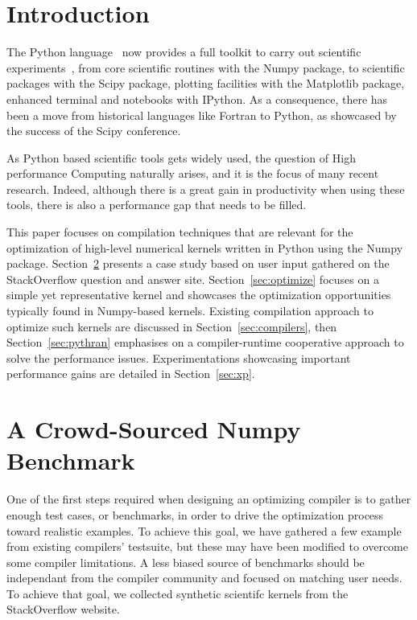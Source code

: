 \documentclass[10pt, preprint]{sigplanconf}
\begin{document}
\section{Introduction}

The Python language~\cite{rossum97} now provides a full toolkit to carry out
scientific experiments~\cite{scipy}, from core scientific routines with the
Numpy package, to scientific packages with the Scipy package, plotting
facilities with the Matplotlib package, enhanced terminal and notebooks with
IPython. As a consequence, there has been a move from historical languages like
Fortran to Python, as showcased by the success of the Scipy conference.

As Python based scientific tools gets widely used, the question of High
performance Computing naturally arises, and it is the focus of many recent
research. Indeed, although there is a great gain in productivity when using
these tools, there is also a performance gap that needs to be filled.

This paper focuses on compilation techniques that are relevant for the
optimization of high-level numerical kernels written in Python using the Numpy
package. Section~\ref{sec:stackoverflow} presents a case study based on user
input gathered on the StackOverflow question and answer site.
Section~\ref{sec:optimize} focuses on a simple yet representative kernel and
showcases the optimization opportunities typically found in Numpy-based
kernels. Existing compilation approach to optimize such kernels are discussed
in Section~\ref{sec:compilers}, then Section~\ref{sec:pythran} emphasises on a
compiler-runtime cooperative approach to solve the performance issues.
Experimentations showcasing important performance gains are detailed in
Section~\ref{sec:xp}.


\section{A Crowd-Sourced Numpy Benchmark}
\label{sec:stackoverflow}

One of the first steps required when designing an optimizing compiler is to
gather enough test cases, or benchmarks, in order to drive the optimization
process toward realistic examples. To achieve this goal, we have gathered a few
example from existing compilers' testsuite, but these may have been modified to
overcome some compiler limitations. A less biased source of benchmarks should
be independant from the compiler community and focused on matching user needs.
To achieve that goal, we collected synthetic scientifc kernels from the
StackOverflow website.
\end{document}
